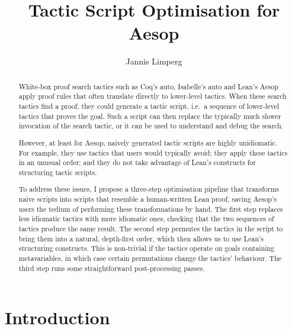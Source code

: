 \documentclass[sigplan,10pt,anonymous,review]{acmart}
\begin{document}
\begin{abstract}
  White-box proof search tactics such as Coq's auto, Isabelle's auto and Lean's Aesop apply proof rules that often translate directly to lower-level tactics.
  When these search tactics find a proof, they could generate a tactic script, i.e.\ a sequence of lower-level tactics that proves the goal.
  Such a script can then replace the typically much slower invocation of the search tactic, or it can be used to understand and debug the search.

  However, at least for Aesop, naively generated tactic scripts are highly unidiomatic.
  For example, they use tactics that users would typically avoid; they apply these tactics in an unusual order; and they do not take advantage of Lean's constructs for structuring tactic scripts.

  To address these issues, I propose a three-step optimisation pipeline that transforms naive scripts into scripts that resemble a human-written Lean proof, saving Aesop's users the tedium of performing these transformations by hand.
  The first step replaces less idiomatic tactics with more idiomatic ones, checking that the two sequences of tactics produce the same result.
  The second step permutes the tactics in the script to bring them into a natural, depth-first order, which then allows us to use Lean's structuring constructs.
  This is non-trivial if the tactics operate on goals containing metavariables, in which case certain permutations change the tactics' behaviour.
  The third step runs some straightforward post-processing passes.
\end{abstract}

\title{Tactic Script Optimisation for Aesop}

\author{Jannis Limperg}

\maketitle

\section{Introduction}%
\label{sec:intro}
\end{document}
